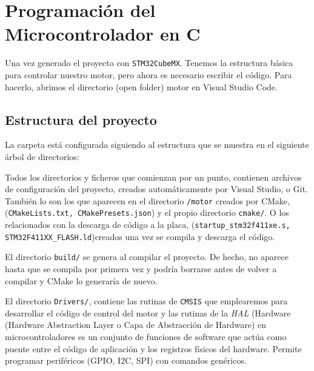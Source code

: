 \chapter{Programación del Microcontrolador en C}
Una vez generado el proyecto con \texttt{STM32CubeMX}. Tenemos la estructura básica para controlar nuestro motor, pero ahora es necesario escribir el código. Para hacerlo, abrimos el directorio (open folder) motor en Visual Studio Code.


\section{Estructura del proyecto}
La carpeta  está configurada siguiendo al estructura que se muestra en el siguiente árbol de directorios:

Todos los directorios y ficheros que comienzan por un punto, contienen archivos de configuración del proyecto, creados automáticamente por Visual Studio, o Git. También lo son los que aparecen en el directorio \texttt{/motor} creados por CMake, (\texttt{CMakeLists.txt, CMakePresets.json}) y el propio directorio \texttt{cmake/}. O los relacionados con la descarga de código a la placa, (\texttt{startup\_stm32f411xe.s, STM32F411XX\_FLASH.ld})creados una vez se compila y descarga el código.

El directorio \texttt{build/} se genera al compilar el proyecto. De hecho, no aparece hasta que se compila por primera vez y podría borrarse antes de volver a compilar y CMake lo generaría de nuevo.

El directorio \texttt{Drivers/}, contiene las rutinas de \texttt{CMSIS} que emplearemos para desarrollar el código de control del motor y las rutinas de la \emph{HAL} (Hardware  (Hardware Abstraction Layer o Capa de Abstracción de Hardware) en microcontroladores es un conjunto de funciones de software que actúa como puente entre el código de aplicación y los registros físicos del hardware. Permite programar periféricos (GPIO, I2C, SPI) con comandos genéricos.

